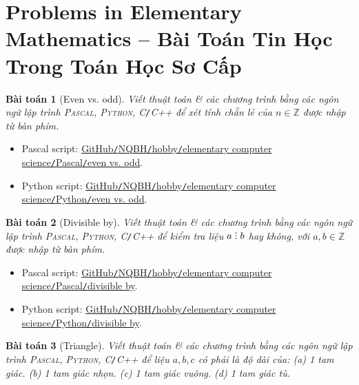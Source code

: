 \documentclass{article}
\newtheorem{baitoan}{Bài toán}
\DeclareRobustCommand{\divby}{%
	\mathrel{\vbox{\baselineskip.65ex\lineskiplimit0pt\hbox{.}\hbox{.}\hbox{.}}}%
}
\begin{document}
\section{Problems in Elementary Mathematics  -- Bài Toán Tin Học Trong Toán Học Sơ Cấp}

\begin{baitoan}[Even vs. odd]
	Viết thuật toán \& các chương trình bằng các ngôn ngữ lập trình \textsc{Pascal, Python, C\texttt{/}C++} để xét tính chẵn lẻ của $n\in\mathbb{Z}$ được nhập từ bàn phím.
\end{baitoan}

\begin{itemize}
	\item Pascal script: \href{https://github.com/NQBH/hobby/blob/master/elementary_computer_science/Pascal/even_odd.pas}{GitHub\texttt{/}NQBH\texttt{/}hobby\texttt{/}elementary computer science\texttt{/}Pascal\texttt{/}even vs. odd}.
	\item Python script: \href{https://github.com/NQBH/hobby/blob/master/elementary_computer_science/Python/even_odd.py}{GitHub\texttt{/}NQBH\texttt{/}hobby\texttt{/}elementary computer science\texttt{/}Python\texttt{/}even vs. odd}.
\end{itemize}

\begin{baitoan}[Divisible by]
	Viết thuật toán \& các chương trình bằng các ngôn ngữ lập trình \textsc{Pascal, Python, C\texttt{/}C++} để kiểm tra liệu $a\divby b$ hay không, với $a,b\in\mathbb{Z}$ được nhập từ bàn phím.
\end{baitoan}

\begin{itemize}
	\item Pascal script: \href{https://github.com/NQBH/hobby/blob/master/elementary_computer_science/Pascal/divisible_by.pas}{GitHub\texttt{/}NQBH\texttt{/}hobby\texttt{/}elementary computer science\texttt{/}Pascal\texttt{/}divisible by}.
	\item Python script: \href{https://github.com/NQBH/hobby/blob/master/elementary_computer_science/Python/divisible_by.py}{GitHub\texttt{/}NQBH\texttt{/}hobby\texttt{/}elementary computer science\texttt{/}Python\texttt{/}divisible by}.
\end{itemize}

\begin{baitoan}[Triangle]
	Viết thuật toán \& các chương trình bằng các ngôn ngữ lập trình \textsc{Pascal, Python, C\texttt{/}C++} để liệu $a,b,c$ có phải là độ dài của: (a) 1 tam giác. (b) 1 tam giác nhọn. (c) 1 tam giác vuông. (d) 1 tam giác tù.
\end{baitoan}
\end{document}
